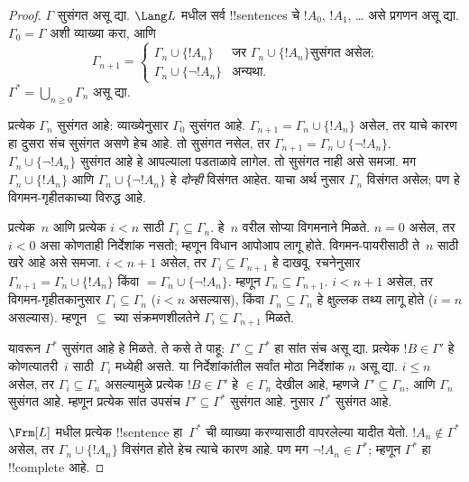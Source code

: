 \documentclass[../../../include/open-logic-section]{subfiles}
\begin{document}
\begin{proof}
$\Gamma$ सुसंगत असू द्या. $\Lang L$ मधील सर्व !!{sentence}s चे
$!A_0$, $!A_1$, \dots{} असे प्रगणन असू द्या. $\Gamma_0 = \Gamma$
अशी व्याख्या करा, आणि
\[
\Gamma_{n+1} =
\begin{cases}
\Gamma_n \cup \{ !A_n \} & \textrm{जर $\Gamma_n \cup \{!A_n\}$
  सुसंगत असेल;} \\
\Gamma_n \cup \{ \lnot !A_n \} & \textrm{अन्यथा.}
\end{cases}
\]
$\Gamma^* = \bigcup_{n \geq 0} \Gamma_n$ असू द्या.

प्रत्येक $\Gamma_n$ सुसंगत आहे: व्याख्येनुसार $\Gamma_0$ सुसंगत आहे.
$\Gamma_{n+1} = \Gamma_n \cup \{!A_n\}$ असेल, तर याचे कारण हा
दुसरा संच सुसंगत असणे हेच आहे. तो सुसंगत नसेल, तर $\Gamma_{n+1} =
\Gamma_n \cup \{\lnot !A_n\}$. $\Gamma_n \cup \{\lnot !A_n\}$
सुसंगत आहे हे आपल्याला पडताळावे लागेल. तो सुसंगत नाही असे समजा. मग
$\Gamma_n \cup \{!A_n\}$ आणि $\Gamma_n \cup \{\lnot !A_n\}$ हे
\emph{दोन्ही} विसंगत आहेत. याचा अर्थ
नुसार $\Gamma_n$ विसंगत असेल; पण हे विगमन-गृहीतकाच्या विरुद्ध आहे.

प्रत्येक~$n$ आणि प्रत्येक $i < n$ साठी $\Gamma_i \subseteq \Gamma_n$.
हे~$n$ वरील सोप्या विगमनाने मिळते. $n=0$ असेल, तर $i < 0$ असा
कोणताही निर्देशांक नसतो; म्हणून विधान आपोआप लागू होते. विगमन-पायरीसाठी ते~$n$
साठी खरे आहे असे समजा. $i < n+1$ असेल, तर $\Gamma_i \subseteq
\Gamma_{n+1}$ हे दाखवू. रचनेनुसार $\Gamma_{n+1} = \Gamma_n \cup
\{!A_n\}$ किंवा $= \Gamma_n \cup \{\lnot !A_n\}$. म्हणून $\Gamma_n
\subseteq \Gamma_{n+1}$. $i < n+1$ असेल, तर विगमन-गृहीतकानुसार
$\Gamma_i \subseteq \Gamma_n$ ($i < n$ असल्यास), किंवा $\Gamma_n
\subseteq \Gamma_n$ हे क्षुल्लक तथ्य लागू होते ($i = n$ असल्यास).
म्हणून~$\subseteq$ च्या संक्रमणशीलतेने $\Gamma_i \subseteq
\Gamma_{n+1}$ मिळते.

यावरून $\Gamma^*$ सुसंगत आहे हे मिळते. ते कसे ते पाहू: $\Gamma'
\subseteq \Gamma^*$ हा सांत संच असू द्या. प्रत्येक $!B \in \Gamma'$
हे कोणत्यातरी~$i$ साठी~$\Gamma_i$ मध्येही असते. या निर्देशांकांतील
सर्वांत मोठा निर्देशांक $n$ असू द्या. $i \le n$ असेल, तर $\Gamma_i
\subseteq \Gamma_n$ असल्यामुळे प्रत्येक $!B \in \Gamma'$ हे
$\in \Gamma_n$ देखील आहे, म्हणजे $\Gamma' \subseteq \Gamma_n$, आणि
$\Gamma_n$ सुसंगत आहे. म्हणून प्रत्येक सांत उपसंच $\Gamma' \subseteq
\Gamma^*$ सुसंगत आहे.
 नुसार $\Gamma^*$
सुसंगत आहे.

$\Frm[L]$ मधील प्रत्येक !!{sentence} हा~$\Gamma^*$ ची व्याख्या
करण्यासाठी वापरलेल्या यादीत येतो. $!A_n \notin \Gamma^*$ असेल, तर
$\Gamma_n \cup \{!A_n\}$ विसंगत होते हेच त्याचे कारण आहे. पण मग
$\lnot !A_n \in \Gamma^*$; म्हणून $\Gamma^*$ हा !!{complete} आहे.
\end{proof}
\end{document}
